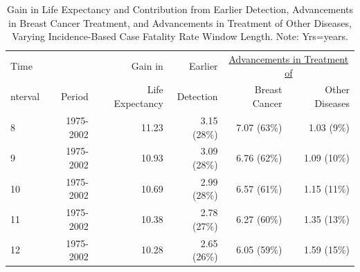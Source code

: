 \documentclass[11pt,letterpaper]{article}
\theoremstyle{plain}
\theoremstyle{remark}
\numberwithin{equation}{section}
\begin{document}
\begin{center}
  \begin{table}[h]
\begin{tabular}{@{}l rrrrr@{}}
 Time & & Gain in & Earlier & \multicolumn{2}{c}{\underline{Advancements in Treatment of}}\\
 nterval &  Period& Life Expectancy & Detection  & Breast Cancer   & Other Diseases  \\ 
  \midrule
  8 & 1975-2002 & 11.23 & 3.15 (28\%) & 7.07 (63\%) & 1.03 (9\%) \\ 
    9 & 1975-2002 & 10.93 & 3.09 (28\%) & 6.76 (62\%) & 1.09 (10\%) \\ 
   10 & 1975-2002 & 10.69 & 2.99 (28\%) & 6.57 (61\%) & 1.15 (11\%) \\ 
   11 & 1975-2002 & 10.38 & 2.78 (27\%) & 6.27 (60\%) & 1.35 (13\%) \\ 
   12 & 1975-2002 & 10.28 & 2.65 (26\%) & 6.05 (59\%) & 1.59 (15\%) \\ 
   \bottomrule
\end{tabular}
\caption{Gain in Life Expectancy and Contribution from Earlier
  Detection, Advancements in Breast Cancer Treatment, and Advancements
  in Treatment of Other Diseases, Varying Incidence-Based Case
  Fatality Rate Window Length.  Note: Yrs=years.}
\end{table}
\end{center}

\newpage
{} 

\end{document}
